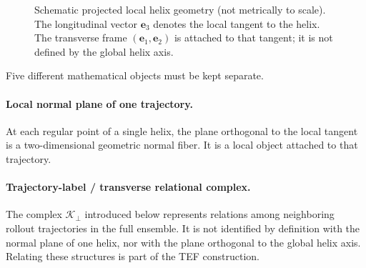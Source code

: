 \documentclass[11pt]{article}
\newcommand{\cK}{\mathcal{K}}
\begin{document}
\begin{figure}[t]
\centering
{}
\caption{Schematic projected local helix geometry (not metrically to scale). The longitudinal vector \(\mathbf e_3\) denotes the local tangent to the helix. The transverse frame \((\mathbf e_1,\mathbf e_2)\) is attached to that tangent; it is not defined by the global helix axis.}
\label{fig:localhelix}
\end{figure}

Five different mathematical objects must be kept separate.

\paragraph{Local normal plane of one trajectory.}
At each regular point of a single helix, the plane orthogonal to the local tangent is a two-dimensional geometric normal fiber. It is a local object attached to that trajectory.

\paragraph{Trajectory-label / transverse relational complex.}
The complex \(\cK_\perp\) introduced below represents relations among neighboring rollout trajectories in the full ensemble. It is not identified by definition with the normal plane of one helix, nor with the plane orthogonal to the global helix axis. Relating these structures is part of the TEF construction.
\end{document}
